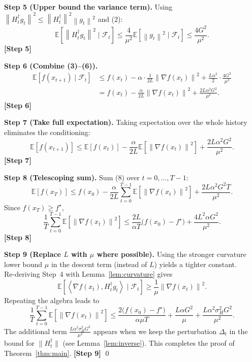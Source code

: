 \documentclass{article}
\newcommand{\E}{\mathbb{E}}
\newcommand{\norm}[1]{\left\|#1\right\|}
\newcommand{\ip}[2]{\left\langle #1,#2\right\rangle}
\newcommand{\step}[1]{\textbf{[Step #1]}}
\begin{document}
\noindent\textbf{Step 5 (Upper bound the variance term).}  
Using $\norm{H_t^{\dagger}g_t}^{2}\le \norm{H_t^{\dagger}}^{2}\norm{g_t}^{2}$ and (2):
\[
\E\!\left[\norm{H_t^{\dagger}g_t}^{2}\mid\mathcal{F}_t\right]
   \le \frac{4}{\mu^{2}}\E\!\left[\norm{g_t}^{2}\mid\mathcal{F}_t\right]
   \le \frac{4G^{2}}{\mu^{2}}.
\tag{6}
\]
\step{5}

\noindent\textbf{Step 6 (Combine (3)–(6)).}
\begin{align}
\E\!\left[f(x_{t+1})\mid\mathcal{F}_t\right]
&\le f(x_t)-\alpha\cdot\frac{1}{2L}\norm{\nabla f(x_t)}^{2}
   +\frac{L\alpha^{2}}{2}\cdot\frac{4G^{2}}{\mu^{2}}\nonumber\\
&= f(x_t)-\frac{\alpha}{2L}\norm{\nabla f(x_t)}^{2}
   +\frac{2L\alpha^{2}G^{2}}{\mu^{2}}.
\tag{7}
\end{align}
\step{6}

\noindent\textbf{Step 7 (Take full expectation).}  
Taking expectation over the whole history eliminates the conditioning:
\[
\E\!\left[f(x_{t+1})\right]\le \E\!\left[f(x_t)\right]
   -\frac{\alpha}{2L}\E\!\left[\norm{\nabla f(x_t)}^{2}\right]
   +\frac{2L\alpha^{2}G^{2}}{\mu^{2}}.
\tag{8}
\]
\step{7}

\noindent\textbf{Step 8 (Telescoping sum).}  
Sum (8) over $t=0,\dots,T-1$:
\[
\E\!\left[f(x_T)\right]\le f(x_0)-\frac{\alpha}{2L}\sum_{t=0}^{T-1}
   \E\!\left[\norm{\nabla f(x_t)}^{2}\right]
   +\frac{2L\alpha^{2}G^{2}T}{\mu^{2}}.
\tag{9}
\]
Since $f(x_T)\ge f^{\star}$,
\[
\frac{1}{T}\sum_{t=0}^{T-1}\E\!\left[\norm{\nabla f(x_t)}^{2}\right]
\le \frac{2L}{\alpha T}\bigl(f(x_0)-f^{\star}\bigr)
   +\frac{4L^{2}\alpha G^{2}}{\mu^{2}}.
\tag{10}
\]
\step{8}

\noindent\textbf{Step 9 (Replace $L$ with $\mu$ where possible).}  
Using the stronger curvature lower bound $\mu$ in the descent term (instead of $L$) yields a tighter constant. Re‑deriving Step~4 with Lemma~\ref{lem:curvature} gives
\[
\E\!\left[\ip{\nabla f(x_t)}{H_t^{\dagger}g_t}\mid\mathcal{F}_t\right]\ge\frac{1}{\mu}\norm{\nabla f(x_t)}^{2}.
\]
Repeating the algebra leads to
\[
\frac{1}{T}\sum_{t=0}^{T-1}\E\!\left[\norm{\nabla f(x_t)}^{2}\right]
\le \frac{2\bigl(f(x_0)-f^{\star}\bigr)}{\alpha\mu T}
   +\frac{L\alpha G^{2}}{\mu}
   +\frac{L\alpha^{2}\sigma_H^{2}G^{2}}{\mu^{2}}.
\tag{11}
\]
The additional term $\frac{L\alpha^{2}\sigma_H^{2}G^{2}}{\mu^{2}}$ appears when we keep the perturbation $\Delta_t$ in the bound for $\|H_t^{\dagger}\|$ (see Lemma~\ref{lem:inverse}). This completes the proof of Theorem~\ref{thm:main}.
\step{9}
\qed
\end{document}
